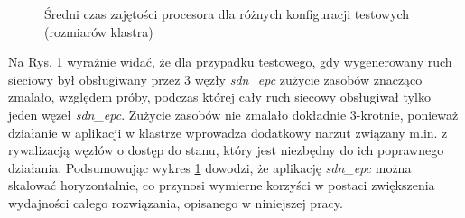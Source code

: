 \begin{figure}[h]
\centering
{}
\caption{Średni czas zajętości procesora dla różnych konfiguracji testowych
  (rozmiarów klastra)}
\label{plot:cpu_usage}
\end{figure}

Na Rys. \ref{plot:cpu_usage} wyraźnie widać, że dla przypadku testowego, gdy
wygenerowany ruch sieciowy był obsługiwany przez 3 węzły \textit{sdn\_epc}
zużycie zasobów znacząco zmalało, względem próby, podczas której cały ruch
siecowy obsługiwał tylko jeden węzeł \textit{sdn\_epc}. Zużycie zasobów nie
zmalało dokładnie 3-krotnie, ponieważ działanie w aplikacji w klastrze wprowadza
dodatkowy narzut związany m.in. z rywalizacją węzłów o dostęp do stanu, który
jest niezbędny do ich poprawnego działania. Podsumowując wykres
\ref{plot:cpu_usage} dowodzi, że aplikację \textit{sdn\_epc} można skalować
horyzontalnie, co przynosi wymierne korzyści w postaci zwiększenia wydajności
całego rozwiązania, opisanego w niniejszej pracy.